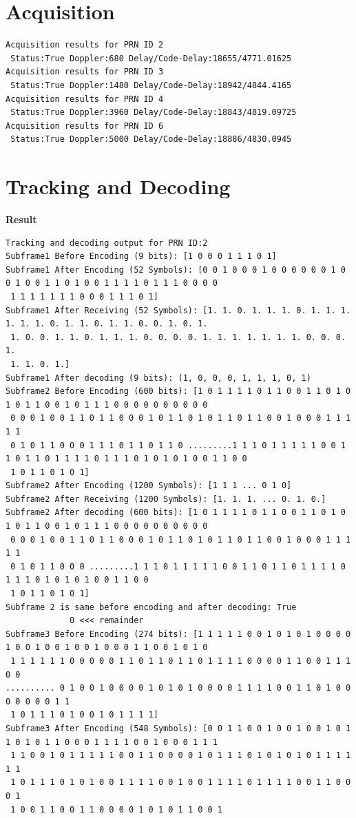 \section{Acquisition}

\begin{lstlisting}
Acquisition results for PRN ID 2
 Status:True Doppler:680 Delay/Code-Delay:18655/4771.01625
Acquisition results for PRN ID 3
 Status:True Doppler:1480 Delay/Code-Delay:18942/4844.4165
Acquisition results for PRN ID 4
 Status:True Doppler:3960 Delay/Code-Delay:18843/4819.09725
Acquisition results for PRN ID 6
 Status:True Doppler:5000 Delay/Code-Delay:18886/4830.0945
\end{lstlisting}
\newpage
\section{Tracking and Decoding}
\textbf{Result}
\begin{lstlisting}
Tracking and decoding output for PRN ID:2
Subframe1 Before Encoding (9 bits): [1 0 0 0 1 1 1 0 1]
Subframe1 After Encoding (52 Symbols): [0 0 1 0 0 0 1 0 0 0 0 0 0 1 0 0 1 0 0 1 1 0 1 0 0 1 1 1 1 0 1 1 1 0 0 0 0
 1 1 1 1 1 1 1 0 0 0 1 1 1 0 1]
Subframe1 After Receiving (52 Symbols): [1. 1. 0. 1. 1. 1. 0. 1. 1. 1. 1. 1. 1. 0. 1. 1. 0. 1. 1. 0. 0. 1. 0. 1.
 1. 0. 0. 1. 1. 0. 1. 1. 1. 0. 0. 0. 0. 1. 1. 1. 1. 1. 1. 1. 0. 0. 0. 1.
 1. 1. 0. 1.]
Subframe1 After decoding (9 bits): (1, 0, 0, 0, 1, 1, 1, 0, 1)
Subframe2 Before Encoding (600 bits): [1 0 1 1 1 1 0 1 1 0 0 1 1 0 1 0 1 0 1 1 0 0 1 0 1 1 1 0 0 0 0 0 0 0 0 0 0
 0 0 0 1 0 0 1 1 0 1 1 0 0 0 1 0 1 1 0 1 0 1 1 0 1 1 0 0 1 0 0 0 1 1 1 1 1
 0 1 0 1 1 0 0 0 1 1 1 0 1 1 0 1 1 0 .........1 1 1 0 1 1 1 1 1 0 0 1 1 0 1 1 0 1 1 1 1 0 1 1 1 0 1 0 1 0 1 0 0 1 1 0 0
 1 0 1 1 0 1 0 1]
Subframe2 After Encoding (1200 Symbols): [1 1 1 ... 0 1 0]
Subframe2 After Receiving (1200 Symbols): [1. 1. 1. ... 0. 1. 0.]
Subframe2 After decoding (600 bits): [1 0 1 1 1 1 0 1 1 0 0 1 1 0 1 0 1 0 1 1 0 0 1 0 1 1 1 0 0 0 0 0 0 0 0 0 0
 0 0 0 1 0 0 1 1 0 1 1 0 0 0 1 0 1 1 0 1 0 1 1 0 1 1 0 0 1 0 0 0 1 1 1 1 1
 0 1 0 1 1 0 0 0 .........1 1 1 0 1 1 1 1 1 0 0 1 1 0 1 1 0 1 1 1 1 0 1 1 1 0 1 0 1 0 1 0 0 1 1 0 0
 1 0 1 1 0 1 0 1]
Subframe 2 is same before encoding and after decoding: True
             0 <<< remainder
Subframe3 Before Encoding (274 bits): [1 1 1 1 1 0 0 1 0 1 0 1 0 0 0 0 1 0 0 1 0 0 1 0 0 1 0 0 0 1 1 0 0 1 0 1 0
 1 1 1 1 1 1 0 0 0 0 0 1 1 0 1 1 0 1 1 0 1 1 1 1 0 0 0 0 1 1 0 0 1 1 1 0 0
.......... 0 1 0 0 1 0 0 0 0 1 0 1 0 1 0 0 0 0 1 1 1 1 0 0 1 1 0 1 0 0 0 0 0 0 0 1 1
 1 0 1 1 1 0 1 0 0 1 0 1 1 1 1]
Subframe3 After Encoding (548 Symbols): [0 0 1 1 0 0 1 0 0 1 0 0 1 0 1 1 0 1 0 1 1 0 0 0 1 1 1 1 0 0 1 0 0 0 1 1 1
 1 1 0 0 1 0 1 1 1 1 1 0 0 1 1 0 0 0 0 1 0 1 1 1 0 1 0 1 0 1 0 1 1 1 1 1 1
 1 0 1 1 1 0 1 0 1 0 0 1 1 1 1 0 0 1 0 0 1 1 1 1 0 1 1 1 1 0 0 1 1 0 0 0 1
 1 0 0 1 1 0 0 1 1 0 0 0 0 1 0 1 0 1 1 0 0 1
\end{lstlisting}
